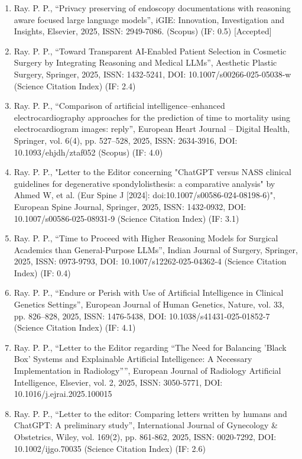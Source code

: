 \documentclass[11pt,a4paper]{moderncv}
\begin{document}
\begin{adjustwidth}{6em}{0pt}
\begin{enumerate}
		\item Ray. P. P., “Privacy preserving of endoscopy documentations with reasoning aware focused large language models”, iGIE: Innovation, Investigation and Insights, Elsevier, 2025, ISSN: 2949-7086. (Scopus) (IF: 0.5) [Accepted]
		
		\item Ray. P. P., “Toward Transparent AI-Enabled Patient Selection in Cosmetic Surgery by Integrating Reasoning and Medical LLMs”, Aesthetic Plastic Surgery, Springer, 2025, ISSN: 1432-5241, DOI: 10.1007/s00266-025-05038-w (Science Citation Index) (IF: 2.4) 
		
		\item Ray. P. P., “Comparison of artificial intelligence–enhanced electrocardiography approaches for the prediction of time to mortality using electrocardiogram images: reply”, European Heart Journal – Digital Health, Springer, vol. 6(4), pp. 527–528, 2025, ISSN: 2634-3916, DOI: 10.1093/ehjdh/ztaf052 (Scopus) (IF: 4.0)
		
		\item Ray. P. P.,  "Letter to the Editor concerning "ChatGPT versus NASS clinical guidelines for degenerative spondylolisthesis: a comparative analysis" by Ahmed W, et al. (Eur Spine J [2024]: doi:10.1007/s00586-024-08198-6)", European Spine Journal, Springer, 2025, ISSN: 1432-0932, DOI: 10.1007/s00586-025-08931-9 (Science Citation Index) (IF: 3.1)
		\item Ray. P. P., “Time to Proceed with Higher Reasoning Models for Surgical Academics than General-Purpose LLMs”, Indian Journal of Surgery, Springer, 2025, ISSN: 0973-9793, DOI: 10.1007/s12262-025-04362-4 (Science Citation Index) (IF: 0.4)
		
		\item Ray. P. P., “Endure or Perish with Use of Artificial Intelligence in Clinical Genetics Settings”, European Journal of Human Genetics, Nature, vol. 33, pp. 826–828, 2025, ISSN: 1476-5438, DOI: 10.1038/s41431-025-01852-7 (Science Citation Index) (IF: 4.1)
		
		\item Ray. P. P., “Letter to the Editor regarding “The Need for Balancing 'Black Box' Systems and Explainable Artificial Intelligence: A Necessary Implementation in Radiology””, European Journal of Radiology Artificial Intelligence, Elsevier, vol. 2, 2025, ISSN: 3050-5771, DOI: 10.1016/j.ejrai.2025.100015 
		
		\item Ray. P. P., “Letter to the editor: Comparing letters written by humans and ChatGPT: A preliminary study”, International Journal of Gynecology \& Obstetrics, Wiley, vol. 169(2), pp. 861-862, 2025, ISSN: 0020-7292, DOI: 10.1002/ijgo.70035 (Science Citation Index) (IF: 2.6)
		

\end{enumerate}
\end{adjustwidth}
\end{document}

